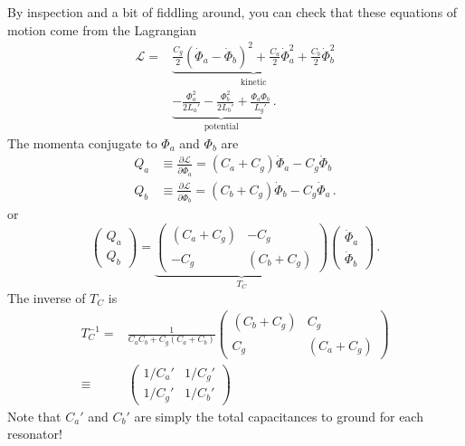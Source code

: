 \documentclass{article}
\begin{document}
By inspection and a bit of fiddling around, you can check that these equations of motion come from the Lagrangian
\begin{align}
  \mathcal{L}
  =& \underbrace{\frac{C_g}{2} \left(\dot \Phi_a - \dot \Phi_b \right)^2
   + \frac{C_a}{2} \dot \Phi_a^2 + \frac{C_b}{2} \dot \Phi_b^2}_\text{kinetic} \nonumber \\
  & \underbrace{- \frac{\Phi_a^2}{2 L_a'} - \frac{\Phi_b^2}{2 L_b'} + \frac{\Phi_a \Phi_b}{L_g'}}_\text{potential} \, .
\end{align}
The momenta conjugate to $\Phi_a$ and $\Phi_b$ are
\begin{align*}
  Q_a & \equiv \frac{\partial \mathcal{L}}{\partial \dot \Phi_a} = (C_a + C_g) \dot \Phi_a - C_g \dot \Phi_b \\
  Q_b & \equiv \frac{\partial \mathcal{L}}{\partial \dot \Phi_b} = (C_b + C_g) \dot \Phi_b - C_g \dot \Phi_a
  \, .
\end{align*}
or
\begin{equation*}
  \left( \begin{array}{c} Q_a \\ Q_b \end{array} \right)
  =
  \underbrace{
    \left( \begin{array}{cc}
       (C_a + C_g) & -C_g \\
       -C_g & (C_b + C_g) \end{array} \right)
  }_{T_C}
  \left( \begin{array}{c} \dot \Phi_a \\ \dot \Phi_b \end{array} \right)
  \, .
\end{equation*}
The inverse of $T_C$ is
\begin{align*}
  T_C^{-1} =& \frac{1}{C_a C_b + C_g (C_a + C_b)}
  \left( \begin{array}{cc}
    (C_b + C_g) & C_g \\
    C_g & (C_a + C_g)
  \end{array} \right) \\
  \equiv& \left( \begin{array}{cc}
    1 / C_a' & 1 / C_g' \\
    1 / C_g' & 1 / C_b'
  \end{array} \right)
\end{align*}
Note that $C_a'$ and $C_b'$ are simply the total capacitances to ground for each resonator!
\end{document}
